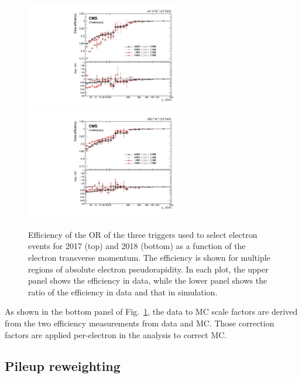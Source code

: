 \begin{figure}[hbtp]
    \begin{center}
    \includegraphics[width=0.6\textwidth]{Efficiency/Electron/electron_trig_eff_2017.pdf}
    \includegraphics[width=0.6\textwidth]{Efficiency/Electron/electron_trig_eff_2018.pdf}
    \caption{Efficiency of the OR of the three triggers used to select electron events for 2017 (top) and 2018 (bottom) as a function of the electron 
        transverse momentum. The efficiency is shown for multiple regions of absolute electron pseudorapidity. In each plot, the upper panel shows 
        the efficiency in data, while the lower panel shows the ratio of the efficiency in data and that in simulation.}
    \label{fig:hlteff_electron}
    \end{center}
\end{figure}

As shown in the bottom panel of Fig.~\ref{fig:hlteff_electron}, the data to MC scale factors are derived
from the two efficiency measurements from data and MC. Those correction factors are applied per-electron 
in the analysis to correct MC.

\subsection{Pileup reweighting}
\label{subsec:pu_reweighting}

